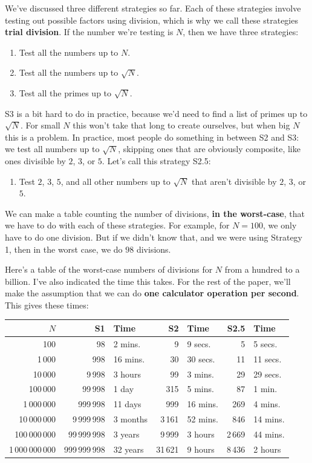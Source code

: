 \documentclass[11pt,paper=letter]{scrartcl}
\begin{document}
We've discussed three different strategies so far. Each of these strategies involve testing out possible factors using division, which is why we call these strategies \textbf{trial division}. If the number we're testing is $N$, then we have three strategies:
\begin{enumerate}[itemsep=-0.5ex]
  \item[S1.] Test all the numbers up to $N$.
  \item[S2.] Test all the numbers up to $\sqrt{N}$.
  \item[S3.] Test all the primes up to $\sqrt{N}$.
\end{enumerate}
S3 is a bit hard to do in practice, because we'd need to find a list of primes up to $\sqrt{N}$. For small $N$ this won't take that long to create ourselves, but when big $N$ this is a problem. In practice, most people do something in between S2 and S3: we test all numbers up to $\sqrt{N}$, skipping ones that are obviously composite, like ones divisible by $2$, $3$, or $5$. Let's call this strategy S2.5:
\begin{enumerate}
  \item[S2.5.] Test $2$, $3$, $5$, and all other numbers up to $\sqrt{N}$ that aren't divisible by $2$, $3$, or $5$.
\end{enumerate}
We can make a table counting the number of divisions, \textbf{in the worst-case}, that we have to do with each of these strategies. For example, for $N = 100$, we only have to do one division. But if we didn't know that, and we were using Strategy 1, then in the worst case, we do $98$ divisions.

Here's a table of the worst-case numbers of divisions for $N$ from a hundred to a billion. I've also indicated the time this takes. For the rest of the paper, we'll make the assumption that we can do \textbf{one calculator operation per second}. This gives these times:
\begin{center}
\begin{tabular}{rrlrlrl}
$N$                & S1    & Time     & S2 & Time     & S2.5 & Time     \\ \hline
100              & 98            & 2 mins.  & 9          & 9 secs.  & 5          & 5 secs.  \\
1\,000           & 998           & 16 mins. & 30         & 30 secs. & 11         & 11 secs. \\
10\,000          & 9\,998        & 3 hours  & 99         & 3 mins.  & 29         & 29 secs. \\
100\,000         & 99\,998       & 1 day    & 315        & 5 mins.  & 87         & 1 min.   \\
1\,000\,000      & 999\,998      & 11 days  & 999        & 16 mins. & 269        & 4 mins.  \\
10\,000\,000     & 9\,999\,998   & 3 months & 3\,161     & 52 mins. & 846        & 14 mins.  \\
100\,000\,000    & 99\,999\,998  & 3 years  & 9\,999     & 3 hours  & 2\,669     & 44 mins. \\
1\,000\,000\,000 & 999\,999\,998 & 32 years & 31\,621    & 9 hours  & 8\,436     & 2 hours
\end{tabular}
\end{center}
\end{document}
